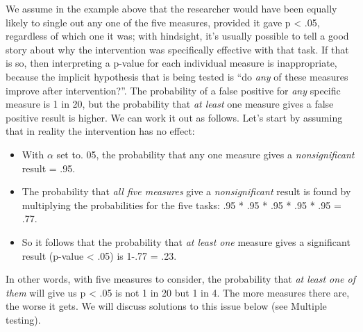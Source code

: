 \documentclass{krantz}
\providecommand{\tightlist}{%
\setlength{\itemsep}{0pt}\setlength{\parskip}{0pt}}
\begin{document}
We assume in the example above that the researcher would have been equally likely to single out any one of the five measures, provided it gave p \textless{} .05, regardless of which one it was; with hindsight, it's usually possible to tell a good story about why the intervention was specifically effective with that task. If that is so, then interpreting a p-value for each individual measure is inappropriate, because the implicit hypothesis that is being tested is ``do \emph{any} of these measures improve after intervention?''. The probability of a false positive for \emph{any} specific measure is 1 in 20, but the probability that \emph{at least} one measure gives a false positive result is higher. We can work it out as follows. Let's start by assuming that in reality the intervention has no effect:

\begin{itemize}
\tightlist
\item
  With \(\alpha\) set to. 05, the probability that any one measure gives a \emph{nonsignificant} result = .95.
\item
  The probability that \emph{all five measures} give a \emph{nonsignificant} result is found by multiplying the probabilities for the five tasks: .95 * .95 * .95 * .95 * .95 = .77.
\item
  So it follows that the probability that \emph{at least one} measure gives a significant result (p-value \textless{} .05) is 1-.77 = .23.
\end{itemize}

In other words, with five measures to consider, the probability that \emph{at least one of them} will give us p \textless{} .05 is not 1 in 20 but 1 in 4. The more measures there are, the worse it gets. We will discuss solutions to this issue below (see Multiple testing).
\end{document}
